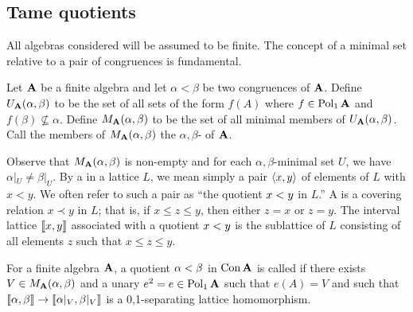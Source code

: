 


\subsection{Tame quotients}
All algebras considered will be assumed to be finite. 
The concept of a minimal set relative to a pair of congruences is fundamental.

\begin{definition}
Let $\mathbf{A}$ be a finite algebra and let $\alpha < \beta$ be two congruences of $\mathbf{A}$. 
Define $U_{\mathbf{A}} (\alpha, \beta)$ to be the set of all sets of the form 
$f(A)$ where $f\in \operatorname{Pol}_1\mathbf{A}$ and $f(\beta)\nsubseteq \alpha$.
Define $M_{\mathbf{A}} (\alpha, \beta)$ to be the set 
of all minimal members of $U_{\mathbf{A}} (\alpha, \beta)$.
Call the members of $M_{\mathbf{A}} (\alpha, \beta)$ the 
$\alpha,\beta$- of $\mathbf{A}$.
\end{definition}
\newcommand\Mab{\ensuremath{M_\bA (\alpha, \beta)}}
Observe that $\Mab$ is non-empty and for each $\alpha,\beta$-minimal set 
$U$, we have $\alpha|_U \neq \beta|_U$.
By a  in a lattice $L$, we mean simply a pair $\langle x,y\rangle$ 
of elements of $L$ with $x < y$. 
We often refer to such a pair as ``the quotient $x < y$ in $L$.'' 
A  is a covering relation $x\prec y$ in $L$; that is,  
if $x\leq z\leq y$, then either $z=x$ or $z=y$.
The interval lattice $\llbracket x,y \rrbracket$ associated with a quotient $x < y$ 
is the sublattice of $L$ consisting of all elements $z$ such that 
$x \leq z \leq y$. 

\begin{definition}
For a finite algebra $\mathbf{A}$, a quotient $\alpha < \beta$
in $\operatorname{Con} \mathbf{A}$ is called  if there exists $V \in \Mab$ 
and a unary $e^2=e \in \operatorname{Pol}_1\mathbf{A}$ such that $e(A) = V$ and 
such that $\llbracket \alpha, \beta \rrbracket \to \llbracket \alpha|_V, \beta|_V \rrbracket$ 
is a 0,1-separating lattice homomorphism.
\end{definition}

